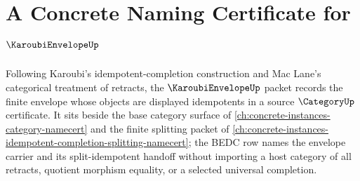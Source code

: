 \chapter{A Concrete Naming Certificate for $\KaroubiEnvelopeUp$}
\label{ch:concrete-instances-karoubi-envelope-namecert}

Following Karoubi's idempotent-completion construction and Mac Lane's categorical treatment of retracts, the $\KaroubiEnvelopeUp$ packet records the finite envelope whose objects are displayed idempotents in a source $\CategoryUp$ certificate. It sits beside the base category surface of \autoref{ch:concrete-instances-category-namecert} and the finite splitting packet of \autoref{ch:concrete-instances-idempotent-completion-splitting-namecert}; the BEDC row names the envelope carrier and its split-idempotent handoff without importing a host category of all retracts, quotient morphism equality, or a selected universal completion.

